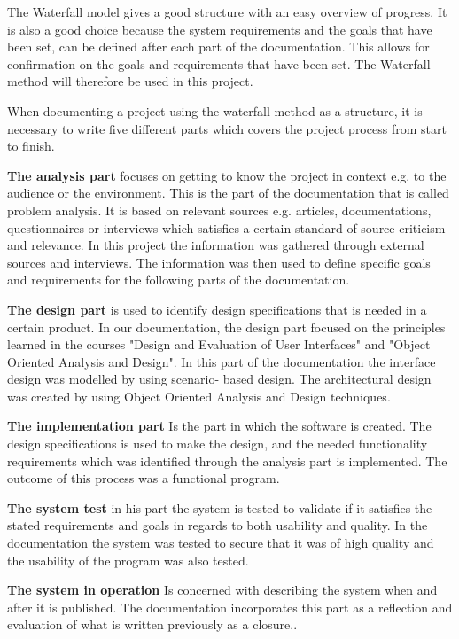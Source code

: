 The Waterfall model gives a good structure with an easy overview of progress. It is also a good choice because the system requirements and the goals that have been set, can be defined after each part of the documentation. This allows for confirmation on the goals and requirements that have been set. The Waterfall method will therefore be used in this project.       

When documenting a project using the waterfall method as a structure, it is necessary to write five different parts which covers the project process from start to finish.

\textbf{The analysis part} focuses on getting to know the project in context e.g. to the audience or the environment. This is the part of the documentation that is called problem analysis. It is based on relevant sources e.g. articles, documentations, questionnaires or interviews which satisfies a certain standard of source criticism and relevance. In this project the information was gathered through external sources and interviews. The information was then used to define specific goals and requirements for the following parts of the documentation.

\textbf{The design part} is used to identify design specifications that is needed in a certain product. In our documentation, the design part focused on the principles learned in the courses "Design and Evaluation of User Interfaces" and "Object Oriented Analysis and Design". In this part of the documentation the interface design was modelled by using scenario- based design. The architectural design was created by using Object Oriented Analysis and Design techniques. 

\textbf{The implementation part} Is the part in which the software is created. The design specifications is used to make the design, and the needed functionality requirements which was identified through the analysis part is implemented. The outcome of this process was a functional program.

\textbf{The system test} in his part the system is tested to validate if it satisfies the stated requirements and goals in regards to both usability and quality. In the documentation the system was tested to secure that it was of high quality and the usability of the program was also tested. 

\textbf{The system in operation} Is concerned with describing the system when and after it is published. The documentation incorporates this part as a reflection and evaluation of what is written previously as a closure.. 